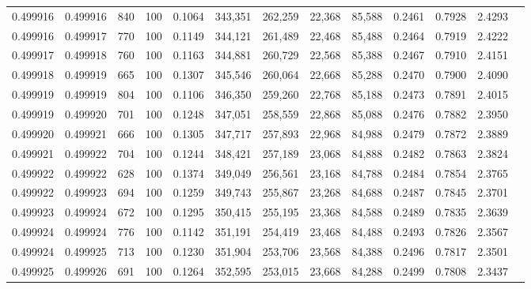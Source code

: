 \begin{tabular}{rrrrrrrrrrrrr}
0.499916 & 0.499916 &   840 & 100 &                                     0.1064 & 343,351 & 262,259 &  22,368 &  85,588 & 0.2461 & 0.7928 & 2.4293 \\
0.499916 & 0.499917 &   770 & 100 &                                     0.1149 & 344,121 & 261,489 &  22,468 &  85,488 & 0.2464 & 0.7919 & 2.4222 \\
0.499917 & 0.499918 &   760 & 100 &                                     0.1163 & 344,881 & 260,729 &  22,568 &  85,388 & 0.2467 & 0.7910 & 2.4151 \\
0.499918 & 0.499919 &   665 & 100 &                                     0.1307 & 345,546 & 260,064 &  22,668 &  85,288 & 0.2470 & 0.7900 & 2.4090 \\
0.499919 & 0.499919 &   804 & 100 &                                     0.1106 & 346,350 & 259,260 &  22,768 &  85,188 & 0.2473 & 0.7891 & 2.4015 \\
0.499919 & 0.499920 &   701 & 100 &                                     0.1248 & 347,051 & 258,559 &  22,868 &  85,088 & 0.2476 & 0.7882 & 2.3950 \\
0.499920 & 0.499921 &   666 & 100 &                                     0.1305 & 347,717 & 257,893 &  22,968 &  84,988 & 0.2479 & 0.7872 & 2.3889 \\
0.499921 & 0.499922 &   704 & 100 &                                     0.1244 & 348,421 & 257,189 &  23,068 &  84,888 & 0.2482 & 0.7863 & 2.3824 \\
0.499922 & 0.499922 &   628 & 100 &                                     0.1374 & 349,049 & 256,561 &  23,168 &  84,788 & 0.2484 & 0.7854 & 2.3765 \\
0.499922 & 0.499923 &   694 & 100 &                                     0.1259 & 349,743 & 255,867 &  23,268 &  84,688 & 0.2487 & 0.7845 & 2.3701 \\
0.499923 & 0.499924 &   672 & 100 &                                     0.1295 & 350,415 & 255,195 &  23,368 &  84,588 & 0.2489 & 0.7835 & 2.3639 \\
0.499924 & 0.499924 &   776 & 100 &                                     0.1142 & 351,191 & 254,419 &  23,468 &  84,488 & 0.2493 & 0.7826 & 2.3567 \\
0.499924 & 0.499925 &   713 & 100 &                                     0.1230 & 351,904 & 253,706 &  23,568 &  84,388 & 0.2496 & 0.7817 & 2.3501 \\
0.499925 & 0.499926 &   691 & 100 &                                     0.1264 & 352,595 & 253,015 &  23,668 &  84,288 & 0.2499 & 0.7808 & 2.3437 \\

\end{tabular}
